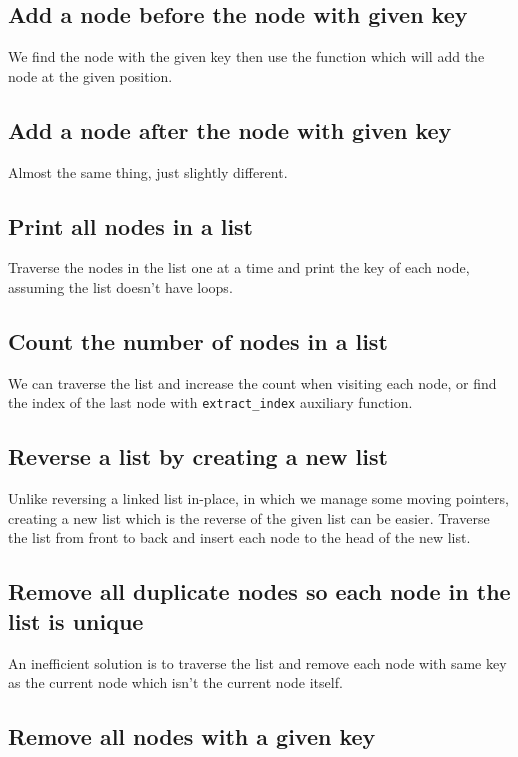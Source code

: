 \documentclass{article}
\begin{document}
\subsection{Add a node before the node with given key}

We find the node with the given key then use the function which will add the node at the given position.


\subsection{Add a node after the node with given key}

Almost the same thing, just slightly different.


\subsection{Print all nodes in a list}

Traverse the nodes in the list one at a time and print the key of each node, assuming the list doesn't have loops.


\subsection{Count the number of nodes in a list}

We can traverse the list and increase the count when visiting each node, or find the index of the last node with \lstinline{extract_index} auxiliary function.


\subsection{Reverse a list by creating a new list}

Unlike reversing a linked list in-place, in which we manage some moving pointers, creating a new list which is the reverse of the given list can be easier. Traverse the list from front to back and insert each node to the head of the new list.


\subsection{Remove all duplicate nodes so each node in the list is unique}

An inefficient solution is to traverse the list and remove each node with same key as the current node which isn't the current node itself.


\subsection{Remove all nodes with a given key}
\end{document}
